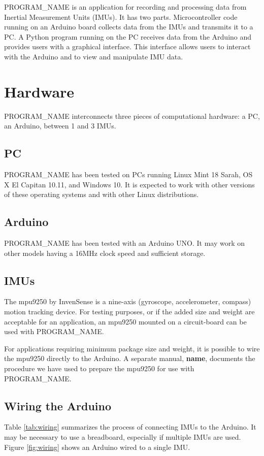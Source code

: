 \documentclass[11pt,letterpaper,article,oneside]{memoir}
\newcommand{\name}{PROGRAM\_NAME}
\begin{document}
\name{} is an application for recording and processing data from Inertial Measurement
Units (IMUs). It has two parts. Microcontroller code running on an Arduino
board collects data from the IMUs and transmits it to a PC. A Python program
running on the PC receives data from the Arduino and provides users with a
graphical interface. This interface allows users to interact with the Arduino
and to view and manipulate IMU data.




\chapter{Hardware}

\name{} interconnects three pieces of computational hardware: a PC, an Arduino,
between 1 and 3 IMUs.

\section{PC}
\name{} has been tested on PCs running Linux Mint 18 Sarah, OS X El Capitan
10.11, and Windows 10. It is expected to work with other versions of these
operating systems and with other Linux distributions.

\section{Arduino}
\name{} has been tested with an Arduino UNO. It may work on other
models having a 16MHz clock speed and sufficient storage.

\section{IMUs}
The mpu9250 by InvenSense is a nine-axis (gyroscope, accelerometer, compass)
motion tracking device.  For testing purposes, or if the added size and weight
are acceptable for an application, an mpu9250 mounted on a circuit-board can be
used with \name{}.

For applications requiring minimum package size and weight, it is possible to
wire the mpu9250 directly to the Arduino. A separate manual, \textbf{name},
documents the procedure we have used to prepare the mpu9250 for use with
\name{}.

\section{Wiring the Arduino}
\label{sec:wiring}
Table \ref{tab:wiring} summarizes the process of connecting IMUs to the
Arduino. It may be necessary to use a breadboard, especially if multiple IMUs
are used. Figure \ref{fig:wiring} shows an Arduino wired to a single IMU.
\end{document}
